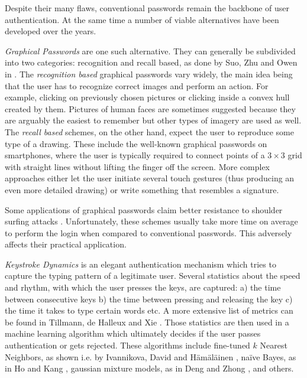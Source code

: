 Despite their many flaws, conventional passwords remain the backbone of user authentication. At the same time a number of viable alternatives have been developed over the years.

\emph{Graphical Passwords} are one such alternative. They can generally be subdivided into two categories: recognition and recall based, as done by Suo, Zhu and Owen in \cite{suo:2005:graphical-passwords-survey}. The \emph{recognition based} graphical passwords vary widely, the main idea being that the user has to recognize correct images and perform an action. For example, clicking on previously chosen pictures or clicking inside a convex hull created by them. Pictures of human faces are sometimes suggested because they are arguably the easiest to remember but other types of imagery are used as well. The \emph{recall based} schemes, on the other hand, expect the user to reproduce some type of a drawing. These include the well-known graphical passwords on smartphones, where the user is typically required to connect points of a \(3 \times 3\) grid with straight lines without lifting the finger off the screen. More complex approaches either let the user initiate several touch gestures (thus producing an even more detailed drawing) or write something that resembles a signature.

Some applications of graphical passwords claim better resistance to shoulder surfing attacks \cite{suo:2005:graphical-passwords-survey}. Unfortunately, these schemes usually take more time on average to perform the login when compared to conventional passwords. This adversely affects their practical application.

\emph{Keystroke Dynamics} is an elegant authentication mechanism which tries to capture the typing pattern of a legitimate user. Several statistics about the speed and rhythm, with which the user presses the keys, are captured: a) the time between consecutive keys b) the time between pressing and releasing the key c) the time it takes to type certain words etc. A more extensive list of metrics can be found in  Tillmann, de Halleux and Xie \cite{teh:2013:survey-keystroke-biometrics}. Those statistics are then used in a machine learning algorithm which ultimately decides if the user passes authentication or gets rejected. These algorithms include fine-tuned \(k\) Nearest Neighbors, as shown i.e. by Ivannikova, David and Hämäläinen \cite{ivannikova:2017:anomaly-detection-keystroke-dynamics}, naïve Bayes, as in Ho and Kang \cite{ho:2017:onenb}, gaussian mixture models, as in Deng and Zhong \cite{yunbin:2013:gmm-keystroke}, and others.

